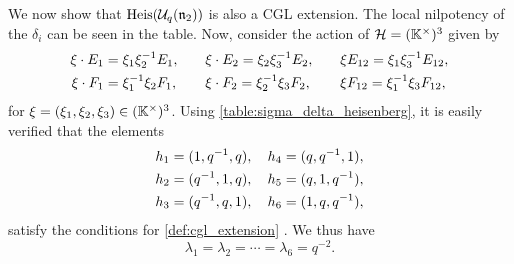 \begin{example}
	We now show that $\operatorname{Heis}(\mathcal{U}_q(\mathfrak{n}_2))$ is also a CGL extension. The local nilpotency
	of the $\delta_i$ can be seen in the table. Now, consider the action of $\mathcal{H} =
		(\mathbb{K}^\times)^3$ given by
	\begin{align*}
		\xi \cdot E_1 & = \xi_1\xi_2^{-1} E_1, \quad &  & \xi \cdot E_2 = \xi_2\xi_3^{-1} E_2, \quad &  & \xi E_{12} = \xi_1 \xi_3^{-1} E_{12}, \\
		\xi \cdot F_1 & = \xi_1^{-1}\xi_2F_1, \quad  &  & \xi \cdot F_2 = \xi_2^{-1}\xi_3 F_2, \quad  &  & \xi F_{12} = \xi_1^{-1} \xi_3 F_{12},
	\end{align*}
	for $\xi = (\xi_1, \xi_2, \xi_3) \in (\mathbb{K}^\times)^3$. Using
	\cref{table:sigma_delta_heisenberg}, it is easily verified that the elements
	\begin{align*}
		h_1 & = (1, q^{-1}, q), \quad h_4 = (q, q^{-1}, 1), \\
		h_2 & = (q^{-1},1, q), \quad h_5 = (q,1, q^{-1}),   \\
		h_3 & = (q^{-1}, q, 1), \quad h_6 = (1, q, q^{-1}),
	\end{align*}
	satisfy the conditions for \cref{def:cgl_extension} . We
	thus have
	\begin{equation}\label{eq:heisenberg_lambda_k}
		\lambda_1 = \lambda_2 = \cdots = \lambda_6 = q^{-2}.
	\end{equation}
\end{example}

